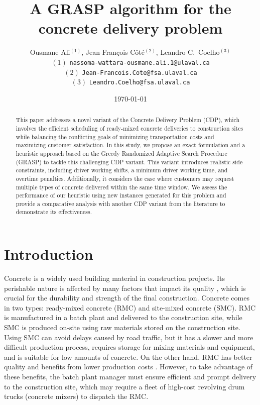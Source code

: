 \documentclass{article}
\title{A GRASP algorithm for the concrete delivery problem}
\author{Ousmane Ali$^{(1)}$, Jean-Fran\c cois C\^ot\'e$^{(2)}$, Leandro C.~Coelho$^{(3)}$\\
 $(1)$ {\tt nassoma-wattara-ousmane.ali.1@ulaval.ca}\\
 $(2)$ {\tt Jean-Francois.Cote@fsa.ulaval.ca}\\
 $(3)$ {\tt Leandro.Coelho@fsa.ulaval.ca}\\
}
\date{\today}
\begin{document}
\maketitle
\begin{abstract}
  This paper addresses a novel variant of the Concrete Delivery Problem (CDP), which involves the efficient scheduling of ready-mixed concrete deliveries to construction sites while balancing the conflicting goals of minimizing transportation costs and maximizing customer satisfaction. In this study, we propose an exact formulation and a heuristic approach based on the Greedy Randomized Adaptive Search Procedure (GRASP) to tackle this challenging CDP variant. This variant introduces realistic side constraints, including driver working shifts, a minimum driver working time, and overtime penalties. Additionally, it considers the case where customers may request multiple types of concrete delivered within the same time window. We assess the performance of our heuristic using new instances generated for this problem and provide a comparative analysis with another CDP variant from the literature to demonstrate its effectiveness.
\end{abstract}




\section{Introduction}
\label{sec:cdp_intro}
Concrete is a widely used building material in construction projects. Its perishable nature is affected by many factors that impact its quality \citep{sinha_quality_2021}, which is crucial for the durability and strength of the final construction. Concrete comes in two types: ready-mixed concrete (RMC) and site-mixed concrete (SMC). RMC is manufactured in a batch plant and delivered to the construction site, while SMC is produced on-site using raw materials stored on the construction site. Using SMC can avoid delays caused by road traffic, but it has a slower and more difficult production process, requires storage for mixing materials and equipment, and is suitable for low amounts of concrete. On the other hand, RMC has better quality and benefits from lower production costs \citep{muresan_comparing}. However, to take advantage of these benefits, the batch plant manager must ensure efficient and prompt delivery to the construction site, which may require a fleet of high-cost revolving drum trucks (concrete mixers) to dispatch the RMC.
\end{document}
